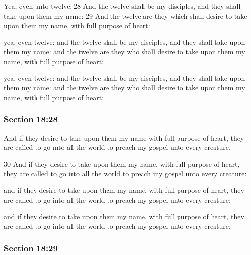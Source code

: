 		\begin{framed}
		\scriptsize
			\begin{compactdesc}
				\item[JSP] Yea, even unto twelve: 28 And the twelve shall be my disciples, and they shall take upon them my name: 29 And the twelve are they which shall desire to take upon them my name, with full purpose of heart:
				\item[DC 1835] yea, even twelve: and the twelve shall be my disciples, and they shall take upon them my name: and the twelve are they who shall desire to take upon them my name, with full purpose of heart: 
				\item[DC 1844] yea, even twelve: and the twelve shall be my disciples, and they shall take upon them my name: and the twelve are they who shall desire to take upon them my name, with full purpose of heart: 
			\end{compactdesc}
		\end{framed}

	\subsubsection{Section 18:28} %
		\label{DC18-28}

		And if they desire to take upon them my name with full purpose of heart, they are called to go into all the world to preach my gospel unto every creature.

		\begin{framed}
		\scriptsize
			\begin{compactdesc}
				\item[JSP] 30 And if they desire to take upon them my name, with full purpose of heart, they are called to go into all the world to preach my gospel unto every creature:
				\item[DC 1835] and if they desire to take upon them my name, with full purpose of heart, they are called to go into all the world to preach my gospel unto every creature: 
				\item[DC 1844] and if they desire to take upon them my name, with full purpose of heart, they are called to go into all the world to preach my gospel unto every creature: 
			\end{compactdesc}
		\end{framed}

	\subsubsection{Section 18:29} %
		\label{DC18-29}

